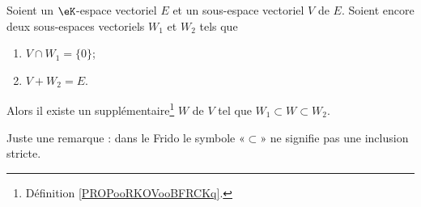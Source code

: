 \begin{lemma}        \label{LEMooSSRXooIyfgNz}
	Soient un \( \eK\)-espace vectoriel \( E\) et un sous-espace vectoriel \( V\) de \( E\). Soient encore deux sous-espaces vectoriels \( W_1\) et \( W_2\) tels que
	\begin{enumerate}
		\item
		      \( V\cap W_1=\{ 0 \}\);
		\item
		      \( V+W_2=E\).
	\end{enumerate}
	Alors il existe un supplémentaire\footnote{Définition \ref{PROPooRKOVooBFRCKq}.} \( W\) de \( V\) tel que \( W_1\subset W\subset W_2\).
\end{lemma}

Juste une remarque : dans le Frido le symbole «\( \subset\)» ne signifie pas une inclusion stricte.

